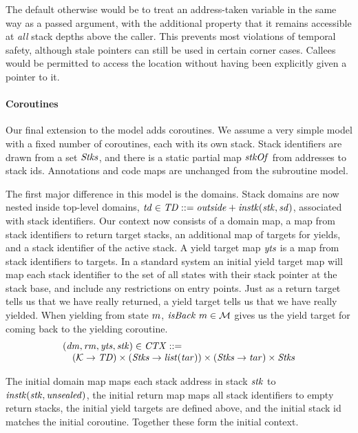 \documentclass[10pt,conference]{ieeetran}%
\theoremstyle{definition}
\begin{document}
{The default otherwise would be to treat an address-taken variable in the
same way as a passed argument, with the additional property
that it remains accessible at \emph{all} stack depths above the caller.
This prevents most violations of temporal safety, although stale pointers
can still be used in certain corner cases. Callees would be permitted
to access the location without having been explicitly given a pointer
to it.

\medskip

\paragraph*{Coroutines}

Our final extension to the model adds coroutines. We assume a very simple model with
a fixed number of coroutines, each with its own stack.
Stack identifiers are drawn from a set \(\mathit{Stks}\), and there is a static partial map
\(\mathit{stkOf}\) from addresses to stack ids.  Annotations and code maps are unchanged from
the subroutine model.

The first major difference in this model is the domains. Stack domains are now nested inside
top-level domains, \(\mathit{td} \in \mathit{TD} ::= \mathit{outside} + \mathit{instk}(\mathit{stk},\mathit{sd})\),
associated with stack identifiers.
Our context now consists of a domain map, a map from stack identifiers to return target stacks,
an additional map of targets for yields, and a stack identifier of the active stack.
A yield target map \(\mathit{yts}\) is a map from stack identifiers to targets.
In a standard system an initial yield target map will map each stack identifier to the
set of all states with their stack pointer at the stack base, and include any restrictions
on entry points. Just as a return target tells us that we have really returned, a yield
target tells us that we have really yielded. When yielding from state \(m\),
\(\mathit{isBack} ~ m \in {\mathcal M}\) gives us the yield target for coming back to the yielding
coroutine.
%
\[\begin{array}{lr}
\multicolumn{2}{l}{(\domMap, \rtm, \yts, \stackid) \in \CONTEXTS ::=} \\
& (\COMPONENTS \rightarrow \TOPDOMS) \times
(\STACKS \rightarrow \listT(\target)) \times 
(\STACKS \rightarrow \target) \times \STACKS
\end{array}\]

The initial domain map maps each stack address in stack \(\mathit{stk}\) to
\(\mathit{instk}(\mathit{stk},\mathit{unsealed})\), the initial return map maps all stack identifiers to empty
return stacks, the initial yield targets are defined above, and the initial stack id matches the initial
coroutine. Together these form the initial context.

}
\end{document}
